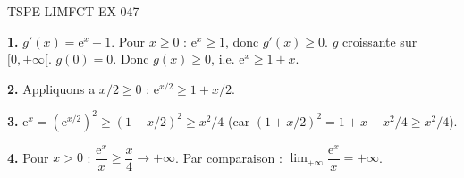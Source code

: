 \begin{corrige}{TSPE-LIMFCT-EX-047}

\textbf{1.} $g'(x) = \mathrm{e}^x - 1$. Pour $x \geq 0$ : $\mathrm{e}^x \geq 1$, donc $g'(x) \geq 0$. $g$ croissante sur $[0, +\infty[$. $g(0) = 0$. Donc $g(x) \geq 0$, i.e. $\mathrm{e}^x \geq 1 + x$.

\textbf{2.} Appliquons a $x/2 \geq 0$ : $\mathrm{e}^{x/2} \geq 1 + x/2$.

\textbf{3.} $\mathrm{e}^x = (\mathrm{e}^{x/2})^2 \geq (1+x/2)^2 \geq x^2/4$ (car $(1+x/2)^2 = 1 + x + x^2/4 \geq x^2/4$).

\textbf{4.} Pour $x > 0$ : $\dfrac{\mathrm{e}^x}{x} \geq \dfrac{x}{4} \to +\infty$. Par comparaison : $\boxed{\lim_{+\infty} \dfrac{\mathrm{e}^x}{x} = +\infty}$.

\end{corrige}

